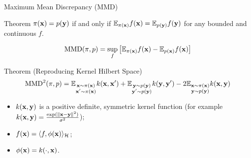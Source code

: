 \begin{frame}{Maximum Mean Discrepancy (MMD)}
	\begin{block}{Theorem}
		$\pi(\mathbf{x}) = p(\mathbf{y})$ if and only if $\mathbb{E}_{\pi(\mathbf{x})} f(\mathbf{x}) = \mathbb{E}_{p(\mathbf{y})} f(\mathbf{y})$ for any bounded and continuous $f$.
	\end{block}
	\vspace{-0.3cm}
	\[
		\text{MMD}(\pi, p) = \sup_f \left[ \mathbb{E}_{\pi(\mathbf{x})} f(\mathbf{x}) - \mathbb{E}_{p(\mathbf{x})} f(\mathbf{x}) \right]
	\]	
	\vspace{-0.3cm}
	\begin{block}{Theorem (Reproducing Kernel Hilbert Space)}
		\vspace{-0.6cm}
		\[
			\text{MMD}^2(\pi, p) = \mathbb{E}_{\substack{\mathbf{x} \sim\pi(\mathbf{x}) \\ \mathbf{x}' \sim\pi(\mathbf{x})}} k(\mathbf{x}, \mathbf{x}') + \mathbb{E}_{\substack{\mathbf{y} \sim p(\mathbf{y}) \\ \mathbf{y}' \sim p(\mathbf{y})}} k(\mathbf{y}, \mathbf{y}') - 2 \mathbb{E}_{\substack{\mathbf{x} \sim\pi(\mathbf{x}) \\ \mathbf{y} \sim p(\mathbf{y})}} k(\mathbf{x}, \mathbf{y})
		\]
		\begin{itemize}
			\item $k(\mathbf{x}, \mathbf{y})$ is a positive definite, symmetric kernel function (for example $k(\mathbf{x}, \mathbf{y}) = \frac{\exp(\|\mathbf{x} - \mathbf{y}\|^2)}{\sigma^2}$);
			\item $f(\mathbf{x}) = \langle f, \phi(\mathbf{x}) \rangle_{\mathcal{H}}$;
			\item $\phi(\mathbf{x}) = k(\cdot, \mathbf{x})$.
		\end{itemize} 
		\vspace{-0.3cm}
	\end{block}
\end{frame}
